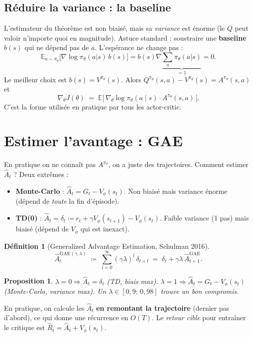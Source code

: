 \documentclass[a4paper,11pt]{article}
\theoremstyle{clean}
\newtheorem*{defn}{Définition}
\newtheorem*{prop}{Proposition}
\newcommand{\E}{\mathbb{E}}
\newcommand{\piT}{\pi_{\theta}}
\begin{document}
\subsection{Réduire la variance : la baseline}

L'estimateur du théorème est non biaisé, mais sa \emph{variance} est énorme (le $Q$ peut valoir n'importe quoi en magnitude). Astuce standard : soustraire une \textbf{baseline} $b(s)$ qui ne dépend pas de $a$. L'espérance ne change pas :
\[
\E_{a\sim\piT}\!\big[\nabla \log\piT(a|s)\, b(s)\big] = b(s) \nabla \underbrace{\sum_a \piT(a|s)}_{=1} = 0.
\]
Le meilleur choix est $b(s) = V^{\piT}(s)$. Alors $Q^{\piT}(s,a) - V^{\piT}(s) = A^{\piT}(s,a)$ et
\[
\boxed{\;\nabla_\theta J(\theta) \;=\; \E\!\big[\, \nabla_\theta \log \piT(a \mid s) \cdot A^{\piT}(s,a) \,\big].\;}
\]
C'est la forme utilisée en pratique par tous les actor-critic.

\section{Estimer l'avantage : GAE}

En pratique on ne connaît pas $A^{\piT}$, on a juste des trajectoires. Comment estimer $\hat A_t$ ? Deux extrêmes :

\begin{itemize}[nosep,leftmargin=1.2em]
\item \textbf{Monte-Carlo} : $\hat A_t = G_t - V_\phi(s_t)$. Non biaisé mais variance énorme (dépend de \emph{toute} la fin d'épisode).
\item \textbf{TD(0)} : $\hat A_t = \delta_t \coloneqq r_t + \gamma V_\phi(s_{t+1}) - V_\phi(s_t)$. Faible variance (1 pas) mais biaisé (dépend de $V_\phi$ qui est inexact).
\end{itemize}

\begin{defn}[Generalized Advantage Estimation, Schulman 2016]
\[
\hat A_t^{\mathrm{GAE}(\gamma,\lambda)} \;\coloneqq\; \sum_{l=0}^{\infty} (\gamma\lambda)^{l}\, \delta_{t+l}
\;=\; \delta_t + \gamma\lambda\, \hat A_{t+1}^{\mathrm{GAE}}.
\]
\end{defn}

\begin{prop}
$\lambda=0 \Rightarrow \hat A_t = \delta_t$ (TD, biais max). $\lambda=1 \Rightarrow \hat A_t = G_t - V_\phi(s_t)$ (Monte-Carlo, variance max). Un $\lambda\in[0{,}9;\,0{,}98]$ trouve un bon compromis.
\end{prop}

En pratique, on calcule les $\hat A_t$ \textbf{en remontant la trajectoire} (dernier pas d'abord), ce qui donne une récurrence en $O(T)$. Le \emph{retour cible} pour entraîner le critique est $\hat R_t = \hat A_t + V_\phi(s_t)$.
\end{document}
